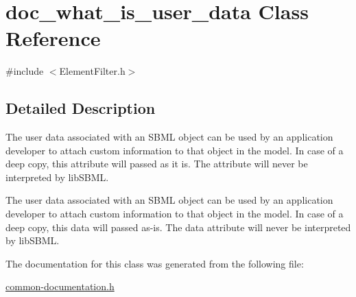 \hypertarget{classdoc__what__is__user__data}{}\section{doc\+\_\+what\+\_\+is\+\_\+user\+\_\+data Class Reference}
\label{classdoc__what__is__user__data}


{\ttfamily \#include $<$Element\+Filter.\+h$>$}



\subsection{Detailed Description}
\begin{DoxyParagraph}{}
The user data associated with an S\+B\+ML object can be used by an application developer to attach custom information to that object in the model. In case of a deep copy, this attribute will passed as it is. The attribute will never be interpreted by lib\+S\+B\+ML.
\end{DoxyParagraph}
\begin{DoxyParagraph}{}
The user data associated with an S\+B\+ML object can be used by an application developer to attach custom information to that object in the model. In case of a deep copy, this data will passed as-\/is. The data attribute will never be interpreted by lib\+S\+B\+ML. 
\end{DoxyParagraph}


The documentation for this class was generated from the following file\+:\begin{DoxyCompactItemize}
\item 
\hyperlink{common-documentation_8h}{common-\/documentation.\+h}\end{DoxyCompactItemize}
